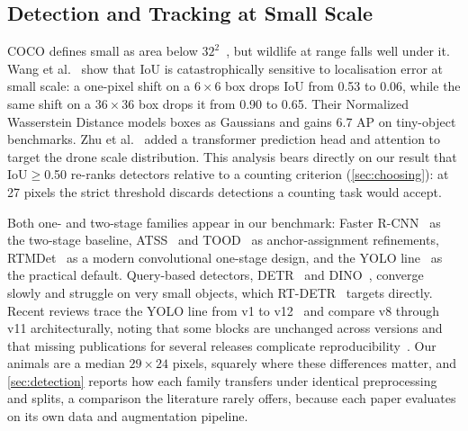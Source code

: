 \subsection{Detection and Tracking at Small Scale}

\label{sec:rw:detect}

COCO defines small as area below $32^2$~\cite{lin2014coco}, but wildlife at range falls well
under it. Wang et al.~\cite{wang2021nwd} show that IoU is catastrophically sensitive to
localisation error at small scale: a one-pixel shift on a $6\times6$ box drops IoU from 0.53 to
0.06, while the same shift on a $36\times36$ box drops it from 0.90 to 0.65. Their Normalized
Wasserstein Distance models boxes as Gaussians and gains 6.7 AP on tiny-object benchmarks. Zhu
et al.~\cite{zhu2021tph} added a transformer prediction head and attention to target the drone
scale distribution. This analysis bears directly on our result that IoU$\geq$0.50 re-ranks
detectors relative to a counting criterion (\cref{sec:choosing}): at 27 pixels the strict
threshold discards detections a counting task would accept.

Both one- and two-stage families appear in our benchmark: Faster R-CNN~\cite{ren2015faster} as
the two-stage baseline, ATSS~\cite{zhang2020atss} and TOOD~\cite{feng2021tood} as
anchor-assignment refinements, RTMDet~\cite{lyu2022rtmdet} as a modern convolutional one-stage
design, and the YOLO line~\cite{redmon2016yolo,wang2024yolov9,wang2024yolov10} as the practical
default. Query-based detectors, DETR~\cite{carion2020detr} and DINO~\cite{zhang2023dino}, converge slowly and struggle on very small objects, which RT-DETR~\cite{zhao2024rtdetr} targets
directly. Recent reviews trace the YOLO line from v1 to v12~\cite{sapkota2025yoloreview} and
compare v8 through v11 architecturally, noting that some blocks are unchanged across versions
and that missing publications for several releases complicate
reproducibility~\cite{hidayatullah2025yolov8}. Our animals are a median $29\times24$ pixels,
squarely where these differences matter, and \cref{sec:detection} reports how each family
transfers under identical preprocessing and splits, a comparison the literature rarely
offers, because each paper evaluates on its own data and augmentation pipeline.

